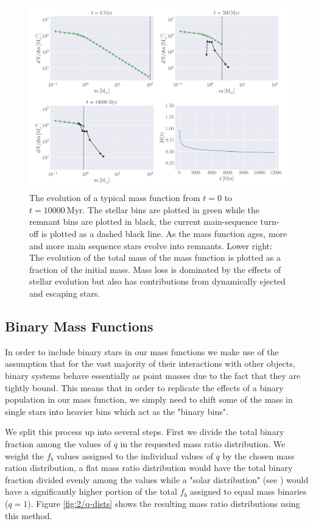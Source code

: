 \begin{figure}
    \centering
    \includegraphics[width=\textwidth]{figures/evolve_mf.png}
    \caption{The evolution of a typical mass function from $t=0$ to $t=10000 \ \mathrm{Myr}$. The
        stellar bins are plotted in green while the remnant bins are plotted in black, the current
        main-sequence turn-off is plotted as a dashed black line. As the mass function ages, more
        and more main sequence stars evolve into remnants. Lower right: The evolution of the total
        mass of the mass function is plotted as a fraction of the initial mass. Mass loss is
        dominated by the effects of stellar evolution but also has contributions from dynamically
        ejected and escaping stars.}
    \label{fig:2/evolve_mf}
\end{figure}


\subsection{Binary Mass Functions}

In order to include binary stars in our mass functions we make use of the assumption that for the
vast majority of their interactions with other objects, binary systems behave essentially as point
masses due to the fact that they are tightly bound. This means that in order to replicate the
effects of a binary population in our mass function, we simply need to shift some of the mass in
single stars into heavier bins which act as the "binary bins".


We split this process up into several steps. First we divide the total binary fraction among the
values of $q$ in the requested mass ratio distribution. We weight the $f_b$ values assigned to the
individual values of $q$ by the chosen mass ration distribution, a flat mass ratio distribution
would have the total binary fraction divided evenly among the values while a "solar distribution"
(see \citealt{Fisher2005}) would have a significantly higher portion of the total $f_b$ assigned to
equal mass binaries ($q=1$). Figure \ref{fig:2/q-dists} shows the resulting mass ratio distributions
using this method.

